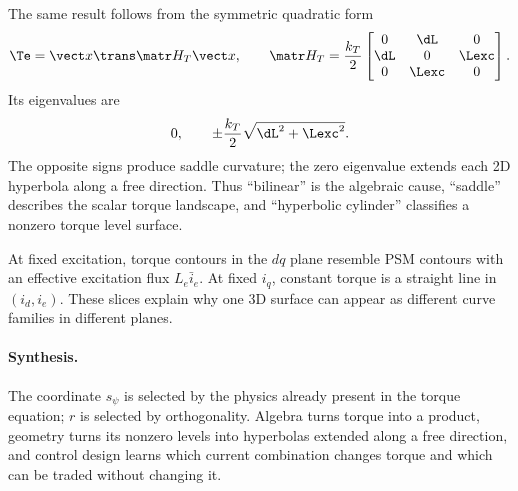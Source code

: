 The same result follows from the symmetric quadratic form
\begin{equation}
 \Te=\state\trans\Hm\state,\qquad
 \Hm=\frac{\kt}{2}\begin{bmatrix}
 0&\dL&0\\ \dL&0&\Lexc\\0&\Lexc&0
 \end{bmatrix}.\label{eq:torque-matrix}
\end{equation}
Its eigenvalues are
\begin{equation}
 0,\qquad \pm\frac{\kt}{2}\sqrt{\dL^2+\Lexc^2}.
\end{equation}
The opposite signs produce saddle curvature; the zero eigenvalue extends each
2D hyperbola along a free direction.  Thus ``bilinear'' is the algebraic cause,
``saddle'' describes the scalar torque landscape, and ``hyperbolic cylinder''
classifies a nonzero torque level surface.

At fixed excitation, torque contours in the $dq$ plane resemble PSM contours
with an effective excitation flux $L_e\bar i_e$.  At fixed $i_q$, constant
torque is a straight line in $(i_d,i_e)$.  These slices explain why one 3D
surface can appear as different curve families in different planes.



\paragraph{Synthesis.}
The coordinate $s_\psi$ is selected by the physics already present in the
torque equation; $r$ is selected by orthogonality.  Algebra turns torque into
a product, geometry turns its nonzero levels into hyperbolas extended along a
free direction, and control design learns which current combination changes
torque and which can be traded without changing it.
